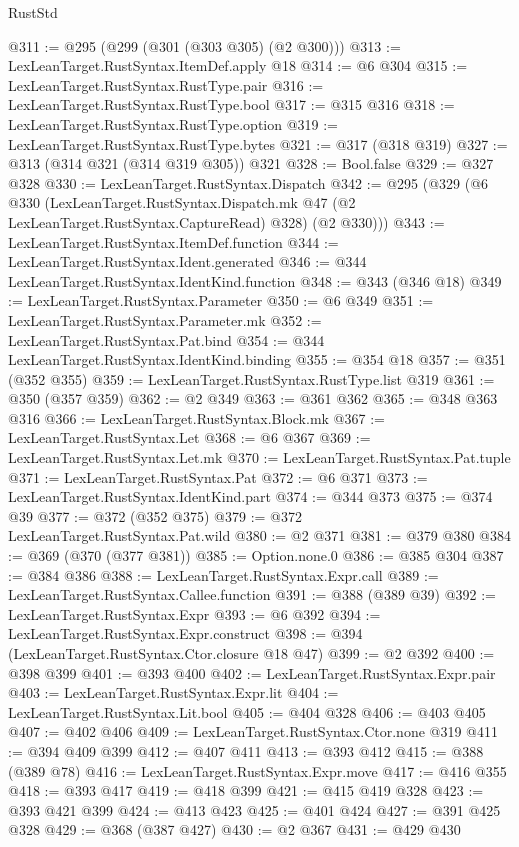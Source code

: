 \begin{lexlean}{RustStd}
\begin{coremodule}
{\begin{coremodule}
{{{{{{{{{{@311 := @295 (@299 (@301 (@303 @305) (@2 @300)))
@313 := LexLeanTarget.RustSyntax.ItemDef.apply @18
@314 := @6 @304
@315 := LexLeanTarget.RustSyntax.RustType.pair
@316 := LexLeanTarget.RustSyntax.RustType.bool
@317 := @315 @316
@318 := LexLeanTarget.RustSyntax.RustType.option
@319 := LexLeanTarget.RustSyntax.RustType.bytes
@321 := @317 (@318 @319)
@327 := @313 (@314 @321 (@314 @319 @305)) @321
@328 := Bool.false
@329 := @327 @328
@330 := LexLeanTarget.RustSyntax.Dispatch
@342 := @295
    (@329
      (@6
        @330
        (LexLeanTarget.RustSyntax.Dispatch.mk @47 (@2 LexLeanTarget.RustSyntax.CaptureRead) @328)
        (@2 @330)))
@343 := LexLeanTarget.RustSyntax.ItemDef.function
@344 := LexLeanTarget.RustSyntax.Ident.generated
@346 := @344 LexLeanTarget.RustSyntax.IdentKind.function
@348 := @343 (@346 @18)
@349 := LexLeanTarget.RustSyntax.Parameter
@350 := @6 @349
@351 := LexLeanTarget.RustSyntax.Parameter.mk
@352 := LexLeanTarget.RustSyntax.Pat.bind
@354 := @344 LexLeanTarget.RustSyntax.IdentKind.binding
@355 := @354 @18
@357 := @351 (@352 @355)
@359 := LexLeanTarget.RustSyntax.RustType.list @319
@361 := @350 (@357 @359)
@362 := @2 @349
@363 := @361 @362
@365 := @348 @363 @316
@366 := LexLeanTarget.RustSyntax.Block.mk
@367 := LexLeanTarget.RustSyntax.Let
@368 := @6 @367
@369 := LexLeanTarget.RustSyntax.Let.mk
@370 := LexLeanTarget.RustSyntax.Pat.tuple
@371 := LexLeanTarget.RustSyntax.Pat
@372 := @6 @371
@373 := LexLeanTarget.RustSyntax.IdentKind.part
@374 := @344 @373
@375 := @374 @39
@377 := @372 (@352 @375)
@379 := @372 LexLeanTarget.RustSyntax.Pat.wild
@380 := @2 @371
@381 := @379 @380
@384 := @369 (@370 (@377 @381))
@385 := Option.none.{0}
@386 := @385 @304
@387 := @384 @386
@388 := LexLeanTarget.RustSyntax.Expr.call
@389 := LexLeanTarget.RustSyntax.Callee.function
@391 := @388 (@389 @39)
@392 := LexLeanTarget.RustSyntax.Expr
@393 := @6 @392
@394 := LexLeanTarget.RustSyntax.Expr.construct
@398 := @394 (LexLeanTarget.RustSyntax.Ctor.closure @18 @47)
@399 := @2 @392
@400 := @398 @399
@401 := @393 @400
@402 := LexLeanTarget.RustSyntax.Expr.pair
@403 := LexLeanTarget.RustSyntax.Expr.lit
@404 := LexLeanTarget.RustSyntax.Lit.bool
@405 := @404 @328
@406 := @403 @405
@407 := @402 @406
@409 := LexLeanTarget.RustSyntax.Ctor.none @319
@411 := @394 @409 @399
@412 := @407 @411
@413 := @393 @412
@415 := @388 (@389 @78)
@416 := LexLeanTarget.RustSyntax.Expr.move
@417 := @416 @355
@418 := @393 @417
@419 := @418 @399
@421 := @415 @419 @328
@423 := @393 @421 @399
@424 := @413 @423
@425 := @401 @424
@427 := @391 @425 @328
@429 := @368 (@387 @427)
@430 := @2 @367
@431 := @429 @430
}}}}}}}}}}
\end{coremodule}}
\end{coremodule}
\end{lexlean}
